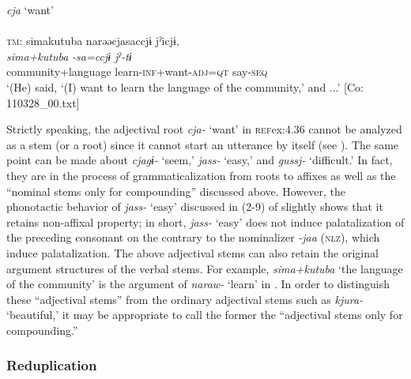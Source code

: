 \ea  \textit{cja} ‘want’ \label{ex:4.36}\\\\
\glll  \textsc{tm}:  simakutuba   narəəcjasaccjɨ  jˀicjɨ,\\
    \textit{sima+kutuba}  \textit{-sa=ccjɨ  jˀ-tɨ}\\
    community+language  learn-\textsc{inf}+want-\textsc{adj}=\textsc{qt}  say-\textsc{seq}\\
    \glt     ‘(He) said, ‘(I) want to learn the language of the community,’ and ...’ [Co: 110328\_00.txt]
\z

Strictly speaking, the adjectival root \textit{cja-} ‘want’ in \textsc{ref}{ex:4.36} cannot be analyzed as a stem (or a root) since it cannot start an utterance by itself (see ). The same point can be made about \textit{cjagɨ-} ‘seem,’ \textit{jass-} ‘easy,’ and \textit{gussj-} ‘difficult.’ In fact, they are in the process of grammaticalization from roots to affixes as well as the “nominal stems only for compounding” discussed above. However, the phonotactic behavior of \textit{jass-} ‘easy’ discussed in (2-9) of  slightly shows that it retains non-affixal property; in short, \textit{jass-} ‘easy’ does not induce palatalization of the preceding consonant on the contrary to the nominalizer \textit{{}-jaa} (\textsc{nlz}), which induce palatalization. The above adjectival stems can also retain the original argument structures of the verbal stems. For example, \textit{sima+kutuba} ‘the language of the community’ is the argument of \textit{naraw-} ‘learn’ in . In order to distinguish these “adjectival stems” from the ordinary adjectival stems such as \textit{kjura-} ‘beautiful,’ it may be appropriate to call the former the “adjectival stems only for compounding.”

\subsubsection{Reduplication}\label{sec:4.2.3.3}

